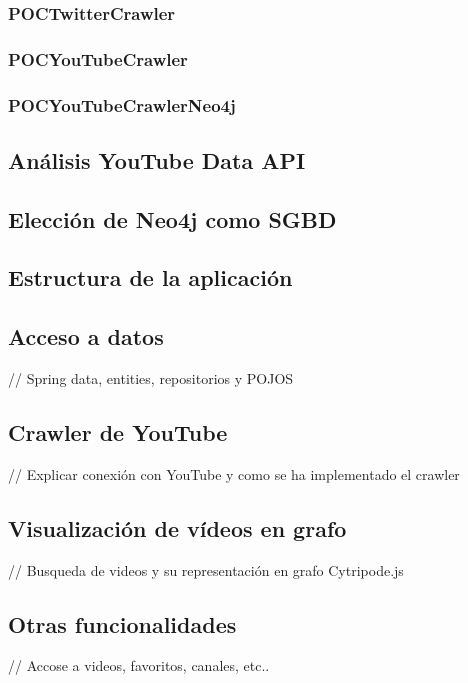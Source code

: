 \documentclass[11pt,a4paper]{article}
\begin{document}
\subsubsection{POCTwitterCrawler}
\medskip 

\subsubsection{POCYouTubeCrawler}
\medskip 

\subsubsection{POCYouTubeCrawlerNeo4j}
\medskip 

\subsection{Análisis YouTube Data API}\label{youTubeDataAPI} 
\medskip 

\subsection{Elección de Neo4j como SGBD}
\medskip 

\subsection{Estructura de la aplicación}
\medskip 

\subsection{Acceso a datos}
// Spring data, entities, repositorios y POJOS
\medskip 

\subsection{Crawler de YouTube}
// Explicar conexión con YouTube y como se ha implementado el crawler
\medskip 

\subsection{Visualización de vídeos en grafo}
// Busqueda de videos y su representación en grafo Cytripode.js
\medskip 

\subsection{Otras funcionalidades}
// Accose a videos, favoritos, canales, etc.. 
\medskip 
\end{document}
